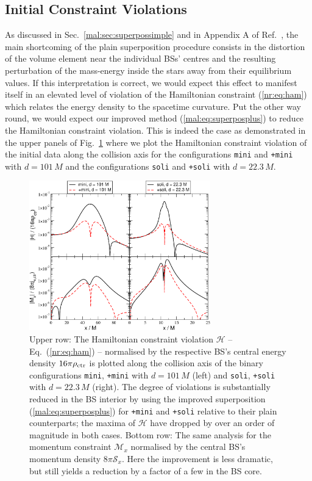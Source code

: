 \subsection{Initial Constraint Violations}
%
As discussed in Sec.~\ref{mal:sec:superpossimple} and in Appendix
A of Ref.~\cite{Helfer:2018vtq},
the main shortcoming of the plain superposition procedure
consists in the distortion of the volume element near the
individual BSs' centres and the resulting perturbation
of the mass-energy inside the stars away from their equilibrium
values. If this interpretation is correct, we would expect
this effect to manifest itself in an elevated level of violation
of the Hamiltonian constraint
(\ref{nr:eq:ham}) which relates the energy density to the
spacetime curvature. Put the other way round, we would
expect our improved method (\ref{mal:eq:superposplus}) to reduce the
Hamiltonian constraint violation. This is indeed the case
as demonstrated in the upper panels of
Fig.~\ref{mal:fig:ham} where we plot the
Hamiltonian constraint violation of the initial data
along the collision axis for the configurations
{\tt mini} and {\tt +mini} with $d=101\,M$ and
the configurations {\tt soli} and {\tt +soli} with
$d=22.3\,M$.
%
\begin{figure}
  \centering
  \includegraphics[width=0.7\textwidth]{malaise_source/constraints.pdf}
  \caption{Upper row: The Hamiltonian constraint violation $\mathcal{H}$ --
  Eq.~(\ref{nr:eq:ham}) -- normalised by the respective BS's
  central energy density $16\pi \rho_{\rm ctr}$
  is plotted along the collision
  axis of the binary configurations {\tt mini}, {\tt +mini}
  with $d=101\,M$ (left) and {\tt soli}, {\tt +soli} with $d=22.3\,M$ (right).
  The degree of violations is substantially reduced in the
  BS interior by using
  the improved superposition (\ref{mal:eq:superposplus})
  for {\tt +mini} and {\tt +soli} relative to their plain
  counterparts; the maxima of $\mathcal{H}$ have dropped by
  over an order of magnitude in both cases.
  Bottom row: The same analysis for the momentum constraint
  $\mathcal{M}_x$
  normalised by the central BS's momentum density
  $8\pi \mathcal{S}_x$. Here the improvement is less dramatic,
  but still yields a reduction by a factor of a few
  in the BS core.
  }
  \label{mal:fig:ham}
\end{figure}
%

